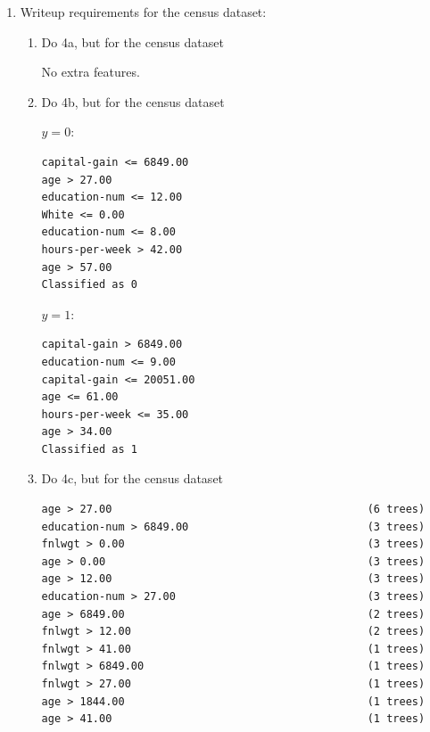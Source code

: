 \documentclass{article}
\begin{document}
\begin{enumerate}
\newpage
    \item Writeup requirements for the census dataset:
    \begin{enumerate}
        \item Do 4a, but for the census dataset
        \begin{mdframed}
          No extra features.
        \end{mdframed}

        \item Do 4b, but for the census dataset
        \begin{mdframed}

$y=0$:
\begin{verbatim}
capital-gain <= 6849.00
age > 27.00
education-num <= 12.00
White <= 0.00
education-num <= 8.00
hours-per-week > 42.00
age > 57.00
Classified as 0
\end{verbatim}

$y=1$:
\begin{verbatim}
capital-gain > 6849.00
education-num <= 9.00
capital-gain <= 20051.00
age <= 61.00
hours-per-week <= 35.00
age > 34.00
Classified as 1
\end{verbatim}

        \end{mdframed}

        \item Do 4c, but for the census dataset
        \begin{mdframed}
\begin{verbatim}
age > 27.00                                        (6 trees)
education-num > 6849.00                            (3 trees)
fnlwgt > 0.00                                      (3 trees)
age > 0.00                                         (3 trees)
age > 12.00                                        (3 trees)
education-num > 27.00                              (3 trees)
age > 6849.00                                      (2 trees)
fnlwgt > 12.00                                     (2 trees)
fnlwgt > 41.00                                     (1 trees)
fnlwgt > 6849.00                                   (1 trees)
fnlwgt > 27.00                                     (1 trees)
age > 1844.00                                      (1 trees)
age > 41.00                                        (1 trees)
\end{verbatim}
        \end{mdframed}


\end{enumerate}
\end{enumerate}
\end{document}
